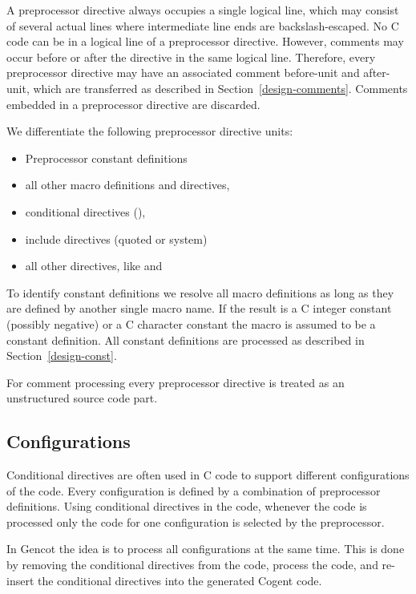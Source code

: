 
A preprocessor directive always occupies a single logical line, which may consist of several actual lines where 
intermediate line ends are backslash-escaped. No C code can be in a logical line of a preprocessor directive.
However, comments may occur before or after the directive in the same logical line. Therefore, every preprocessor 
directive may have an associated comment before-unit and after-unit, which are transferred as described in 
Section~\ref{design-comments}. Comments embedded in a preprocessor directive are discarded.

We differentiate the following preprocessor directive units:
\begin{itemize}
\item Preprocessor constant definitions
\item all other macro definitions and  directives,
\item conditional directives (),
\item include directives (quoted or system)
\item all other directives, like  and 
\end{itemize}

To identify constant definitions we resolve all macro definitions as long as they are defined by another single
macro name. If the result is a C integer constant (possibly negative) or a C character constant the macro is assumed
to be a constant definition. All constant definitions are processed
as described in Section~\ref{design-const}.

For comment processing every preprocessor directive is treated as an unstructured source code part.

\subsection{Configurations}

Conditional directives are often used in C code to support different configurations of the code. Every configuration
is defined by a combination of preprocessor definitions. Using conditional directives in the code, whenever the
code is processed only the code for one configuration is selected by the preprocessor.

In Gencot the idea is to process all configurations at the same time. This is done by removing the conditional 
directives from the code, process the code, and re-insert the conditional directives into the generated Cogent code.

